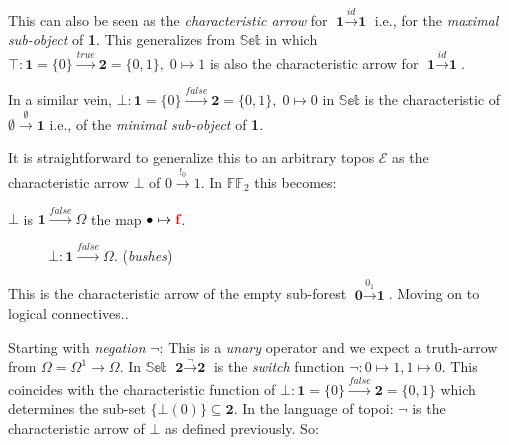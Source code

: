 This can also be seen as the \emph{characteristic arrow} for $\textbf{1} \xrightarrow{id} \textbf{1}$ i.e., for the \emph{maximal sub-object} of \textbf{1}. 
\newline
This generalizes from $\mathbb{Set}$ in which $\top : \textbf{1}=\{0\} \xrightarrow{true} \textbf{2}=\{0,1\}, \; 0 \mapsto 1$ is also the characteristic arrow for $\textbf{1} \xrightarrow{id} \textbf{1}$.

\newpage

In a similar vein, $\bot : \textbf{1}=\{0\} \xrightarrow{false} \textbf{2}=\{0,1\}, \; 0 \mapsto 0 $ in $\mathbb{Set}$ is the characteristic of $\emptyset \xrightarrow{\emptyset} \textbf{1}$ i.e., of the \emph{minimal sub-object} of \textbf{1}. 
\newline

It is straightforward to generalize this to an arbitrary topos $\mathcal{E}$ as the characteristic arrow $\bot$ of $0 \xrightarrow{!_0} 1$. In $\mathbb{FF}_2$ this becomes:

\begin{definition}[$\bot$]
	$\bot$ is $\textbf{1} \xrightarrow{false} \Omega$ the map $\bullet \mapsto \textcolor{red}{\textbf{f}}$.
\end{definition}

\begin{figure}[h]
	\centering
	\caption{$\bot : \mathbf{1} \xrightarrow{false} \Omega$. (\emph{bushes})}
\end{figure}

This is the characteristic arrow of the empty sub-forest $\textbf{0} \xrightarrow{0_1} \textbf{1}$.
\newline
Moving on to logical connectives.. 
\newpage

Starting with \emph{negation} $\neg$: This is a \emph{unary} operator and we expect a truth-arrow from $\Omega=\Omega^1 \rightarrow \Omega$. 
\newline
In $\mathbb{Set}$ $\textbf{2} \xrightarrow{\neg} \textbf{2}$ is the \emph{switch} function $\neg : 0 \mapsto 1, 1 \mapsto 0$. This coincides with the characteristic function of $\bot : \textbf{1}=\{0\} \xrightarrow{false} \textbf{2} = \{0,1\}$ which determines the sub-set $\{\bot(0)\}\subseteq \textbf{2}$. \newline
In the language of topoi: $\neg$ is the characteristic arrow of $\bot$ as defined previously. So:


